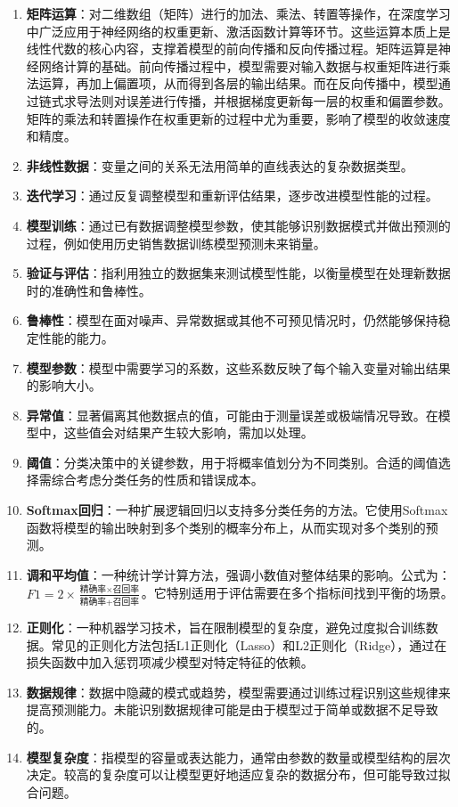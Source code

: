 \begin{enumerate}
\item \textbf{矩阵运算}：对二维数组（矩阵）进行的加法、乘法、转置等操作，在深度学习中广泛应用于神经网络的权重更新、激活函数计算等环节。这些运算本质上是线性代数的核心内容，支撑着模型的前向传播和反向传播过程。矩阵运算是神经网络计算的基础。前向传播过程中，模型需要对输入数据与权重矩阵进行乘法运算，再加上偏置项，从而得到各层的输出结果。而在反向传播中，模型通过链式求导法则对误差进行传播，并根据梯度更新每一层的权重和偏置参数。矩阵的乘法和转置操作在权重更新的过程中尤为重要，影响了模型的收敛速度和精度。
\item \textbf{非线性数据}：变量之间的关系无法用简单的直线表达的复杂数据类型。
\item \textbf{迭代学习}：通过反复调整模型和重新评估结果，逐步改进模型性能的过程。
\item \textbf{模型训练}：通过已有数据调整模型参数，使其能够识别数据模式并做出预测的过程，例如使用历史销售数据训练模型预测未来销量。
\item \textbf{验证与评估}：指利用独立的数据集来测试模型性能，以衡量模型在处理新数据时的准确性和鲁棒性。
\item \textbf{鲁棒性}：模型在面对噪声、异常数据或其他不可预见情况时，仍然能够保持稳定性能的能力。
\item \textbf{模型参数}：模型中需要学习的系数，这些系数反映了每个输入变量对输出结果的影响大小。
\item \textbf{异常值}：显著偏离其他数据点的值，可能由于测量误差或极端情况导致。在模型中，这些值会对结果产生较大影响，需加以处理。
\item \textbf{阈值}：分类决策中的关键参数，用于将概率值划分为不同类别。合适的阈值选择需综合考虑分类任务的性质和错误成本。
\item \textbf{Softmax回归}：一种扩展逻辑回归以支持多分类任务的方法。它使用Softmax函数将模型的输出映射到多个类别的概率分布上，从而实现对多个类别的预测。
\item \textbf{调和平均值}：一种统计学计算方法，强调小数值对整体结果的影响。公式为：\( F1 = 2 \times \frac{\text{精确率} \times \text{召回率}}{\text{精确率} + \text{召回率}} \)。它特别适用于评估需要在多个指标间找到平衡的场景。
\item \textbf{正则化}：一种机器学习技术，旨在限制模型的复杂度，避免过度拟合训练数据。常见的正则化方法包括L1正则化（Lasso）和L2正则化（Ridge），通过在损失函数中加入惩罚项减少模型对特定特征的依赖。
\item \textbf{数据规律}：数据中隐藏的模式或趋势，模型需要通过训练过程识别这些规律来提高预测能力。未能识别数据规律可能是由于模型过于简单或数据不足导致的。
\item \textbf{模型复杂度}：指模型的容量或表达能力，通常由参数的数量或模型结构的层次决定。较高的复杂度可以让模型更好地适应复杂的数据分布，但可能导致过拟合问题。

\end{enumerate}
